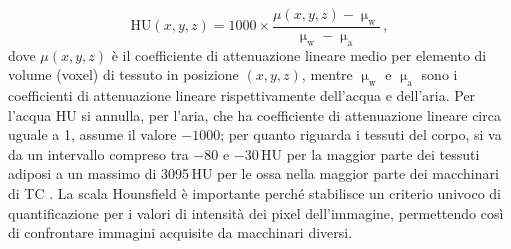 \begin{equation}
    \mathrm{HU}(x,y,z) = 1000\times\frac{\mu(x,y,z) - \upmu_\mathrm{w}}{\upmu_\mathrm{w} - \upmu_\mathrm{a}}\,,
\end{equation}
dove $\mu(x,y,z)$ è il coefficiente di attenuazione lineare medio per elemento di volume (voxel) di tessuto in posizione $(x,y,z)$, mentre $\upmu_\mathrm{w}$ e $\upmu_\mathrm{a}$ sono i coefficienti di attenuazione lineare rispettivamente dell'acqua e dell'aria. Per l’acqua HU si annulla, per l’aria, che ha coefficiente di attenuazione lineare circa uguale a 1, assume il valore $-1000$; per quanto riguarda i tessuti del corpo, si va da un intervallo compreso tra $-80$ e $-30$\,HU per la maggior parte dei tessuti adiposi a un massimo di 3095\,HU per le ossa nella maggior parte dei macchinari di TC \cite[324-325]{bushberg}. La scala Hounsfield è importante perché stabilisce un criterio univoco di quantificazione per i valori di intensità dei pixel dell'immagine, permettendo così di confrontare immagini acquisite da macchinari diversi.
